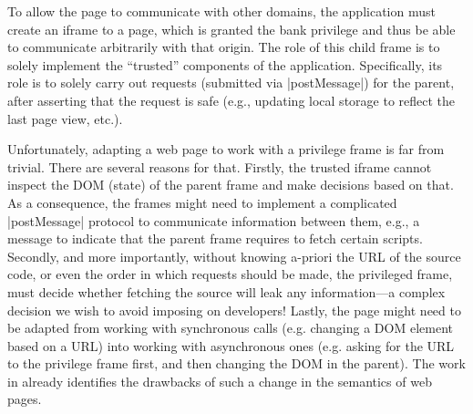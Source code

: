 To allow the page to communicate with other domains, the application
must create an iframe to a  page, which is granted the
bank privilege and thus be able to communicate arbitrarily with that origin.
%
The role of this child frame is to solely implement the ``trusted''
components of the application.
%
Specifically, its role is to solely carry out requests (submitted via
\js|postMessage|) for the parent, after asserting that the request is
safe (e.g., updating local storage to reflect the last page view,
etc.).


Unfortunately, adapting a web page to work with a privilege frame 
is far from trivial. There are several reasons for that. 
%
Firstly, the trusted iframe cannot inspect the DOM (state) of the parent frame
and make decisions based on that. As a consequence, the frames might need to
implement a complicated \js|postMessage| protocol to communicate information
between them, e.g., a message to indicate that the parent frame requires to
fetch certain scripts. Secondly, and more importantly, without knowing a-priori
the URL of the source code, or even the order in which requests should be made,
the privileged frame, must decide whether fetching the source will leak any
information---a complex decision we wish to avoid imposing on developers!
Lastly, the page might need to be adapted from working with synchronous
calls (e.g. changing a DOM element based on a URL) into working with
asynchronous ones (e.g. asking for the URL to the privilege frame first, and
then changing the DOM in the parent). The work in \cite{Ingram:2012} already
identifies the drawbacks of such a change in the semantics of web pages.


%
%
%
%



